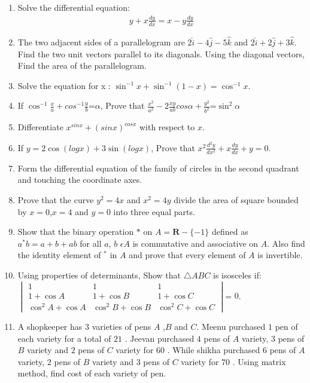 \documentclass{article}
\begin{document}
\begin{enumerate}
\item Solve the differential equation:
	\begin{align}
		y + x \frac{dy}{dx} = x - y \frac{dy}{dx}
	\end{align}
\item The two adjacent sides of a parallelogram are  $ 2\hat{i}-4\hat{j}-5\hat{k} $ and $2\hat{i}+2\hat{j}+3\hat{k} $. Find the two unit vectors parallel to its diagonals. Using the diagonal vectors, Find the area of the parallelogram.
\item Solve the equation for x : $\sin^{-1}x+\sin^{-1}(1-x) = \cos^{-1}x$.
 \item If $\cos^{-1}\frac{x}{a}+cos^{-1}\frac{y}{b}$=$\alpha$, Prove that $\frac{x^2}{a^2}-2\frac{xy}{ab}cos\alpha+\frac{y^2}{b^2}$=$\sin^2\alpha$
 \item Differentiate $x^{sinx}+(sinx)^{cosx}$ with respect to $x$.
 \item If $ y=2\cos(logx)+3\sin(logx)$, Prove that $x^2\frac{d^2y}{dx^2}+x\frac{dy}{dx}+y=0$.
 \item Form the differential equation of the family of circles in the second quadrant and touching the coordinate axes.
 \item Prove that the curve $y^2=4x$ and $x^2=4y$ divide the area of square bounded by $x=0$,$x=4$ and $y=0$ into three equal parts.
 \item Show that the binary operation $*$ on  $A=\textbf{R}-\{-1\}$ defined as $a^*b =a+b+ab$ for all $a$, $b$ $\epsilon A$ is commutative and associative on $A$. Also find the identity element of $^*$ in $A$ and prove that every element of $A$ is invertible.
 \item Using properties of determinants, Show that $\triangle ABC$ is isosceles if: \\
$\begin{vmatrix}1 & 1 & 1 \\1 + \cos A & 1 + \cos B & 1 + \cos C \\\cos^2 A + \cos A & \cos^2 B + \cos B & \cos^2 C + \cos C
\end{vmatrix}$= $0$.
 \item A shopkeeper has $3$ varieties of pens $A$ ,$B$ and $C$. Meenu purchased $1$ pen of each variety for a total of \rupee $21$ . Jeevan purchased $4$ pens of $A$ variety, $3$ pens of $B$ variety and $2$ pens of $C$ variety for \rupee $60$ . While shikha purchased $6$ pens of $A$ variety, $2$ pens of $B$ variety and $3$ pens of $C$ variety for \rupee $70$ . Using matrix method, find cost of each variety of pen.

\end{enumerate}
\end{document}
